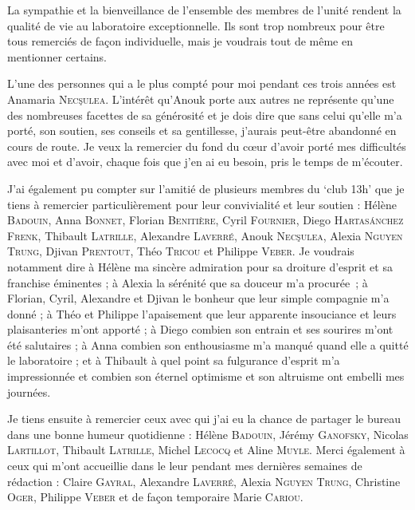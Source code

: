 La sympathie et la bienveillance de l'ensemble des membres de l'unité rendent la qualité de vie au laboratoire exceptionnelle.
Ils sont trop nombreux pour être tous remerciés de façon individuelle, mais je voudrais tout de même en mentionner certains.


L'une des personnes qui a le plus compté pour moi pendant ces trois années est Anamaria \textsc{Nec\c{s}ulea}.
L'intérêt qu'Anouk porte aux autres ne représente qu'une des nombreuses facettes de sa générosité et je dois dire que sans celui qu'elle m'a porté, son soutien, ses conseils et sa gentillesse, j'aurais peut-être abandonné en cours de route.
Je veux la remercier du fond du cœur d'avoir porté mes difficultés avec moi et d'avoir, chaque fois que j'en ai eu besoin, pris le temps de m'écouter.


J'ai également pu compter sur l'amitié de plusieurs membres du ‘club 13h’ que je tiens à remercier particulièrement pour leur convivialité et leur soutien :
Hélène \textsc{Badouin},
Anna \textsc{Bonnet},
Florian \textsc{Benitière},
Cyril \textsc{Fournier},
Diego \textsc{Hartas\'anchez Frenk},
Thibault \textsc{Latrille},
Alexandre \textsc{Laverré}, 
Anouk \textsc{Nec\c{s}ulea},
Alexia \textsc{Nguyen Trung},
Djivan \textsc{Prentout},
Théo \textsc{Tricou} et
Philippe \textsc{Veber}.
Je voudrais notamment dire 
à Hélène ma sincère admiration pour sa droiture d'esprit et sa franchise éminentes ; 
à Alexia la sérénité que sa douceur m'a procurée~;
à Florian, Cyril, Alexandre et Djivan le bonheur que leur simple compagnie m'a donné ;
à Théo et Philippe l'apaisement que leur apparente insouciance et leurs plaisanteries m'ont apporté ; 
à Diego combien son entrain et ses sourires m'ont été salutaires ;
à Anna combien son enthousiasme m'a manqué quand elle a quitté le laboratoire ;
et à Thibault à quel point sa fulgurance d'esprit m'a impressionnée et combien son éternel optimisme et son altruisme ont embelli mes journées.


Je tiens ensuite à remercier ceux avec qui j'ai eu la chance de partager le bureau dans une bonne humeur quotidienne : Hélène \textsc{Badouin}, Jérémy \textsc{Ganofsky}, Nicolas \textsc{Lartillot}, Thibault \textsc{Latrille}, Michel \textsc{Lecocq} et Aline \textsc{Muyle}.
Merci également à ceux qui m'ont accueillie dans le leur pendant mes dernières semaines de rédaction : Claire \textsc{Gayral}, Alexandre \textsc{Laverré}, Alexia \textsc{Nguyen Trung}, Christine \textsc{Oger}, Philippe \textsc{Veber} et de façon temporaire Marie \textsc{Cariou}.

